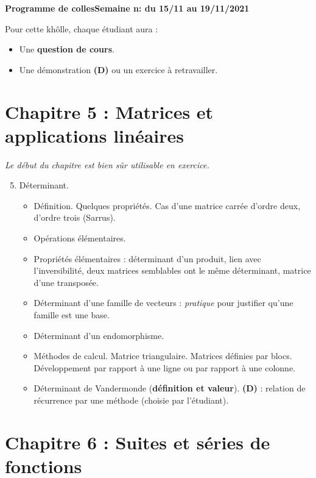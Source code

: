 \documentclass[twoside,a4paper,french,10pt]{VcCours}
\begin{document}

\begin{center}
\large\bf
Programme de collesSemaine n: du 15/11 au 19/11/2021
\end{center}
\separationTitre


Pour cette khôlle, chaque étudiant aura :
\begin{itemize}
\item Une \textbf{question de cours}.
\item Une démonstration \textbf{(D)} ou un exercice à retravailler.
\end{itemize}


\section*{Chapitre 5 : Matrices et applications linéaires}

\emph{Le début du chapitre est bien sûr utilisable en exercice.}
\begin{enumerate}\setcounter{enumi}{4}
\item Déterminant.
\begin{itemize}%
\item Définition. Quelques propriétés. Cas d'une matrice carrée d'ordre deux, d'ordre trois (Sarrus). 
\item Opérations élémentaires.
\item Propriétés élémentaires : déterminant d'un produit, lien avec l'inversibilité, deux matrices semblables ont le même déterminant, matrice d'une transposée.
\item Déterminant d'une famille de vecteurs : \textit{pratique} pour justifier qu'une famille est une base.
\item Déterminant d'un endomorphisme.
\item Méthodes de calcul. Matrice triangulaire. Matrices définies par blocs. Développement par rapport à une ligne ou par rapport à une colonne.
\item Déterminant de Vandermonde (\textbf{définition et valeur}). \textbf{(D)} : relation de récurrence par une méthode (choisie par l'étudiant).
\end{itemize} 
\end{enumerate}

\section*{Chapitre 6 : Suites et séries de fonctions}
\end{document}
